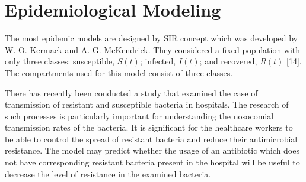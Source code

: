 \chapter*{Epidemiological Modeling}


The most epidemic models are designed by SIR concept which was developed by W. O. Kermack and A. G. McKendrick. They considered a fixed population with only three classes: susceptible, $S(t)$; infected, $I(t)$; and recovered, $R(t)$ [14]. The compartments used for this model consist of three classes.\cite{lamport94}

There has recently been conducted a study that examined the case of transmission of resistant and susceptible bacteria in hospitals. The research of such processes is particularly important for understanding the nosocomial transmission rates of the bacteria. It is significant for the healthcare workers to be able to control the spread of resistant bacteria and reduce their antimicrobial resistance. The model may predict whether the usage of an antibiotic which does not have corresponding resistant bacteria present in the hospital will be useful to decrease the level of resistance in the examined bacteria.
